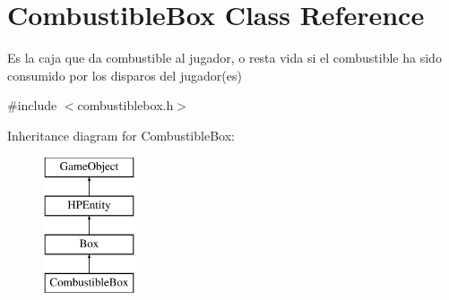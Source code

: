 \hypertarget{class_combustible_box}{\section{Combustible\-Box Class Reference}
\label{class_combustible_box}
}


Es la caja que da combustible al jugador, o resta vida si el combustible ha sido consumido por los disparos del jugador(es)  




{\ttfamily \#include $<$combustiblebox.\-h$>$}

Inheritance diagram for Combustible\-Box\-:\begin{figure}[H]
\begin{center}
\leavevmode
\includegraphics[height=4.000000cm]{class_combustible_box}
\end{center}
\end{figure}
